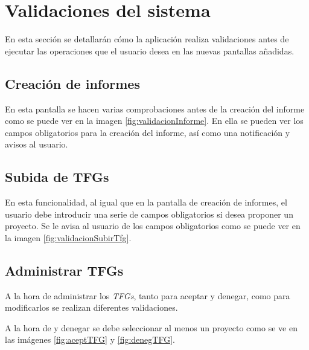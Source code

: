 \section{Validaciones del sistema}

En esta sección se detallarán cómo la aplicación realiza validaciones antes de
ejecutar las operaciones que el usuario desea en las nuevas pantallas añadidas.

\subsection{Creación de informes}

En esta pantalla se hacen varias comprobaciones antes de la creación del informe como se puede ver en la imagen \ref{fig:validacionInforme}.
En ella se pueden ver los campos obligatorios para la creación del informe, así como una notificación y avisos al usuario.


\subsection{Subida de TFGs}

En esta funcionalidad, al igual que en la pantalla de creación de informes, el usuario debe introducir una serie de campos obligatorios si desea proponer un proyecto. Se le avisa al usuario de los campos obligatorios como se puede ver en la imagen \ref{fig:validacionSubirTfg}.


\subsection{Administrar TFGs}
A la hora de administrar los \emph{TFGs}, tanto para aceptar y denegar, como para modificarlos se realizan diferentes validaciones.

A la hora de y denegar se debe seleccionar al menos un proyecto como se ve en las imágenes \ref{fig:aceptTFG} y \ref{fig:denegTFG}.


